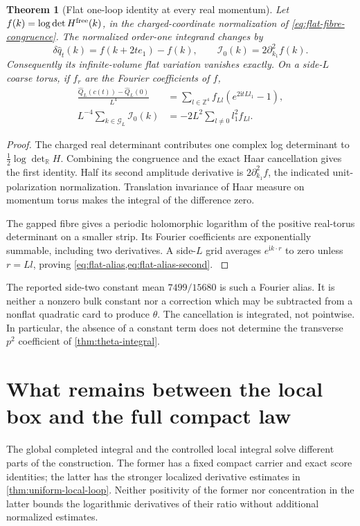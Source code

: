\documentclass[11pt,oneside,openany]{book}
\newtheorem{theorem}{Theorem}[chapter]
\theoremstyle{definition}
\theoremstyle{remark}
\newcommand{\R}{\mathbb R}
\newcommand{\Z}{\mathbb Z}
\newcommand{\ii}{\mathrm i}
\newcommand{\src}[2]{\cite[#2]{#1}}
\begin{document}
\begin{theorem}[Flat one-loop identity at every real momentum]
\label{thm:flat-bloch}
Let $f(k)=\log\det H^{\rm free}(k)$, in the charged-coordinate
normalization of \cref{eq:flat-fibre-congruence}. The normalized
order-one integrand changes by
\[
 \delta\widehat q_t(k)=f(k+2te_1)-f(k),\qquad
 \mathcal I_0(k)=2\partial_{k_1}^2f(k).
\]
Consequently its infinite-volume flat variation vanishes exactly. On a
side-$L$ coarse torus, if $f_r$ are the Fourier coefficients of $f$,
\begin{align}
 \frac{\widehat Q_L(c(t))-\widehat Q_L(0)}{L^4}
   &=\sum_{l\in\Z^4}f_{Ll}(e^{2\ii tLl_1}-1),\label{eq:flat-alias}\\
 L^{-4}\sum_{k\in\mathcal G_L}\mathcal I_0(k)
   &=-2L^2\sum_{l\ne0}l_1^2 f_{Ll}.\label{eq:flat-alias-second}
\end{align}
\end{theorem}
\begin{proof}
The charged real determinant contributes one complex log determinant
to $\tfrac12\log\det_{\R}H$. Combining the congruence and the exact
Haar cancellation gives the first identity. Half its second amplitude
derivative is $2\partial_{k_1}^2f$, the indicated unit-polarization
normalization. Translation invariance of Haar measure on momentum
torus makes the integral of the difference zero.

The gapped fibre gives a periodic holomorphic logarithm of the positive
real-torus determinant on a smaller strip. Its Fourier coefficients
are exponentially summable, including two derivatives. A side-$L$
grid averages $e^{\ii k\cdot r}$ to zero unless $r=Ll$, proving
\cref{eq:flat-alias,eq:flat-alias-second}. \src{F12}{V9}
\end{proof}
The reported side-two constant mean $7499/15680$ is such a Fourier
alias. It is neither a nonzero bulk constant nor a correction which
may be subtracted from a nonflat quadratic card to produce $\theta$.
The cancellation is integrated, not pointwise. In particular, the
absence of a constant term does not determine the transverse $p^2$
coefficient of \cref{thm:theta-integral}.

\section{What remains between the local box and the full compact law}
\label{sec:compact-local-interface}
The global completed integral and the controlled local integral solve
different parts of the construction. The former has a fixed compact
carrier and exact score identities; the latter has the stronger
localized derivative estimates in \cref{thm:uniform-local-loop}.
Neither positivity of the former nor concentration in the latter
bounds the logarithmic derivatives of their ratio without additional
normalized estimates.
\end{document}

